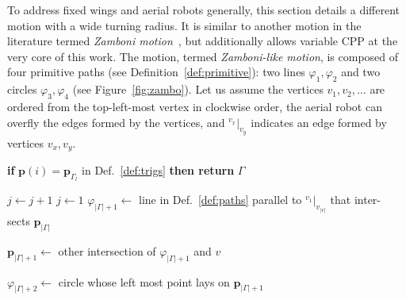\documentclass[letterpaper,10pt,journal,twoside]{IEEEtran}
\theoremstyle{definition}
\begin{document}
To address fixed wings and aerial robots generally, this section details a different motion with a wide turning radius. It is similar to another motion in the literature termed \emph{Zamboni motion}~\cite{araujo2013multiple},
but additionally allows variable CPP at the very core of this work. The motion, termed \emph{Zamboni-like motion}, is composed of four primitive paths (see Definition~\ref{def:primitive}): two lines $\varphi_1,\varphi_2$ and two circles $\varphi_3,\varphi_4$ (see Figure~\ref{fig:zambo}). Let us assume the vertices $v_1,v_2,\dots$ are ordered from the top-left-most vertex in clockwise order, the aerial robot can overfly the edges formed by the vertices, and ${}^{v_x}|_{v_y}$ indicates an edge formed by vertices $v_x,v_y$. 

\begin{algorithm}[h]
  \begin{algorithmic}[1]
    \small

      \STATE \textbf{if} $\mathbf{p}(i)=\mathbf{p}_{\Gamma_l}${ in Def.~\ref{def:trigs}} \textbf{then return }$\Gamma$\vspace*{.3ex}

        

      \vspace*{.8ex}
        \STATE $j\gets j+1$\vspace*{.3ex}
          \STATE $j\gets 1$\vspace*{.3ex}
          \STATE $\varphi_{|\Gamma|+1}\gets$ line in Def.~\ref{def:paths} %
          parallel to ${}^{v_1}|_{v_{|v|}}$ that inter-\vspace*{.5ex} \hspace*{1em}sects $\mathbf{p}_{|\Gamma|}$\vspace*{.3ex}

          \STATE $\mathbf{p}_{|\Gamma|+1}\gets$ other intersection %
          of $\varphi_{|\Gamma|+1}$ and $v$\vspace*{.3ex}

          \STATE $\varphi_{|\Gamma|+2}\gets$ circle %
          whose left most point lays on $\mathbf{p}_{|\Gamma|+1}$\vspace*{.3ex}\label{alg2:circ1}
          

\end{algorithmic}
\end{algorithm}
\end{document}
